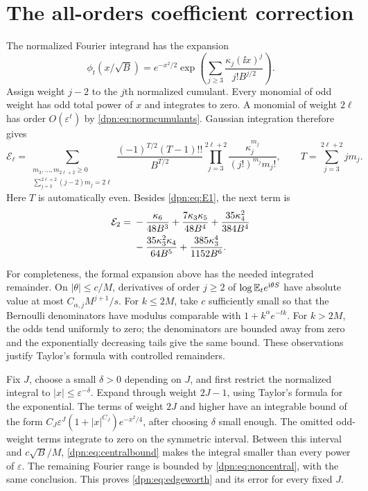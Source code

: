 \documentclass[11pt]{article}
\numberwithin{equation}{section}
\theoremstyle{definition}\newtheorem{definition}[theorem]{Definition}
\theoremstyle{remark}\newtheorem{remark}[theorem]{Remark}
\newcommand{\eps}{\varepsilon}
\begin{document}
\section{The all-orders coefficient correction}\label{dpn:sec:edgeworth}
The normalized Fourier integrand has the expansion
\begin{equation}\label{dpn:eq:centralseries}
 \phi_t(x/\sqrt B)
 =e^{-x^2/2}\exp\left(
       \sum_{j\ge3}\frac{\kappa_j(\ii x)^j}{j!B^{j/2}}\right).
\end{equation}
Assign weight $j-2$ to the $j$th normalized cumulant. Every monomial of odd
weight has odd total power of $x$ and integrates to zero. A monomial of weight
$2\ell$ has order $O(\eps^\ell)$ by \eqref{dpn:eq:normcumulants}.
Gaussian integration therefore gives
\begin{equation}\label{dpn:eq:edgepoly}
 \mathcal E_\ell=
 \sum_{\substack{m_3,\ldots,m_{2\ell+2}\ge0\\
                  \sum_{j=3}^{2\ell+2}(j-2)m_j=2\ell}}
 \frac{(-1)^{T/2}(T-1)!!}{B^{T/2}}
 \prod_{j=3}^{2\ell+2}
       \frac{\kappa_j^{m_j}}{(j!)^{m_j}m_j!},
 \qquad T=\sum_{j=3}^{2\ell+2}jm_j.
\end{equation}
Here $T$ is automatically even. Besides \eqref{dpn:eq:E1}, the next term is
\begin{align}\label{dpn:eq:E2}
 \mathcal E_2={}&-\frac{\kappa_6}{48B^3}
 +\frac{7\kappa_3\kappa_5}{48B^4}
 +\frac{35\kappa_4^2}{384B^4}\notag\\
 &-\frac{35\kappa_3^2\kappa_4}{64B^5}
 +\frac{385\kappa_3^4}{1152B^6}.
\end{align}

For completeness, the formal expansion above has the needed integrated
remainder. On $|\theta|\le c/M$, derivatives of order $j\ge2$ of
$\log\mathbb E_t e^{\mathrm i\theta S}$ have absolute value at most
$C_{\alpha,j}M^{j+1}/s$. For $k\le2M$, take $c$ sufficiently small so that
the Bernoulli denominators have modulus comparable with $1+k^\alpha e^{-tk}$.
For $k>2M$, the odds tend uniformly to zero; the denominators are bounded
away from zero and the exponentially decreasing tails give the same bound.
These observations justify Taylor's formula with controlled remainders.

Fix $J$, choose a small $\delta>0$ depending on $J$, and first restrict the
normalized integral to $|x|\le\eps^{-\delta}$. Expand through weight $2J-1$,
using Taylor's formula for the exponential. The terms of weight $2J$ and
higher have an integrable bound of the form
$C_J\eps^J(1+|x|^{C_J})e^{-x^2/4}$, after choosing $\delta$ small enough.
The omitted odd-weight terms integrate to zero on the symmetric interval.
Between this interval and $c\sqrt B/M$, \eqref{dpn:eq:centralbound} makes the
integral smaller than every power of $\eps$. The remaining Fourier range is
bounded by \eqref{dpn:eq:noncentral}, with the same conclusion. This proves
\eqref{dpn:eq:edgeworth} and its error for every fixed $J$.
\end{document}
